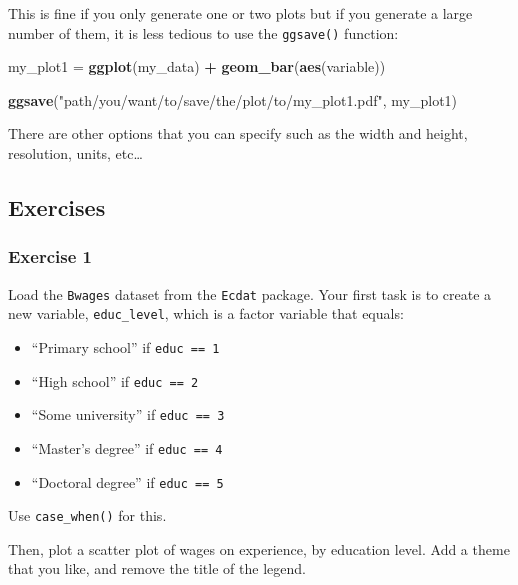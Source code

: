 \documentclass[]{gitbook}
\newenvironment{Shaded}{\begin{snugshade}}{\end{snugshade}}
\newcommand{\KeywordTok}[1]{\textcolor[rgb]{0.13,0.29,0.53}{\textbf{#1}}}
\newcommand{\NormalTok}[1]{#1}
\newcommand{\OperatorTok}[1]{\textcolor[rgb]{0.81,0.36,0.00}{\textbf{#1}}}
\newcommand{\StringTok}[1]{\textcolor[rgb]{0.31,0.60,0.02}{#1}}
\providecommand{\tightlist}{%
  \setlength{\itemsep}{0pt}\setlength{\parskip}{0pt}}
\begin{document}
This is fine if you only generate one or two plots but if you generate a large number of them, it
is less tedious to use the \texttt{ggsave()} function:

\begin{Shaded}
\begin{Highlighting}[]
\NormalTok{my_plot1 =}\StringTok{ }\KeywordTok{ggplot}\NormalTok{(my_data) }\OperatorTok{+}
\StringTok{  }\KeywordTok{geom_bar}\NormalTok{(}\KeywordTok{aes}\NormalTok{(variable))}

\KeywordTok{ggsave}\NormalTok{(}\StringTok{"path/you/want/to/save/the/plot/to/my_plot1.pdf"}\NormalTok{, my_plot1)}
\end{Highlighting}
\end{Shaded}

There are other options that you can specify such as the width and height, resolution, units,
etc\ldots{}

\hypertarget{exercises-3}{%
\subsection{Exercises}\label{exercises-3}}

\hypertarget{exercise-1-3}{%
\subsubsection*{Exercise 1}\label{exercise-1-3}}

Load the \texttt{Bwages} dataset from the \texttt{Ecdat} package. Your first task is to create a new variable,
\texttt{educ\_level}, which is a factor variable that equals:

\begin{itemize}
\tightlist
\item
  ``Primary school'' if \texttt{educ\ ==\ 1}
\item
  ``High school'' if \texttt{educ\ ==\ 2}
\item
  ``Some university'' if \texttt{educ\ ==\ 3}
\item
  ``Master's degree'' if \texttt{educ\ ==\ 4}
\item
  ``Doctoral degree'' if \texttt{educ\ ==\ 5}
\end{itemize}

Use \texttt{case\_when()} for this.

Then, plot a scatter plot of wages on experience, by education level. Add a theme that you like,
and remove the title of the legend.
\end{document}
